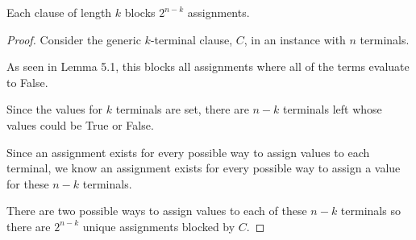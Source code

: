 \documentclass[manuscript]{acmart}
\begin{document}
    \begin{lemma}
        Each clause of length $k$ blocks $2^{n-k}$ assignments.
    \end{lemma}
    \begin{proof}
        Consider the generic $k$-terminal clause, $C$, in an instance with $n$ terminals.

        As seen in Lemma 5.1, this blocks all assignments where all of the terms evaluate to False.

        Since the values for $k$ terminals are set, there are $n-k$ terminals left whose values could be True or False.

        Since an assignment exists for every possible way to assign values to each terminal, we know an assignment exists for every possible way to assign a value for these $n-k$ terminals.

        There are two possible ways to assign values to each of these $n-k$ terminals so there are $2^{n-k}$ unique assignments blocked by $C$.
    \end{proof}
\end{document}
